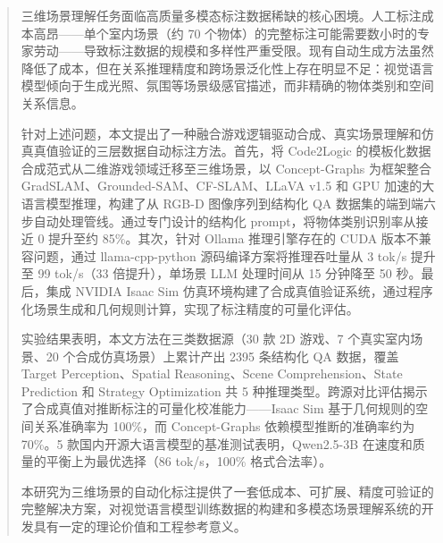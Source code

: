 \documentclass[type=bachelor,oneside]{fduthesis}
\begin{document}
\frontmatter
\tableofcontents

\begin{abstract}
三维场景理解任务面临高质量多模态标注数据稀缺的核心困境。人工标注成本高昂——单个室内场景（约 70 个物体）的完整标注可能需要数小时的专家劳动——导致标注数据的规模和多样性严重受限。现有自动生成方法虽然降低了成本，但在关系推理精度和跨场景泛化性上存在明显不足：视觉语言模型倾向于生成光照、氛围等场景级感官描述，而非精确的物体类别和空间关系信息。

针对上述问题，本文提出了一种融合游戏逻辑驱动合成、真实场景理解和仿真真值验证的三层数据自动标注方法。首先，将 Code2Logic 的模板化数据合成范式从二维游戏领域迁移至三维场景，以 Concept-Graphs 为框架整合 GradSLAM、Grounded-SAM、CF-SLAM、LLaVA v1.5 和 GPU 加速的大语言模型推理，构建了从 RGB-D 图像序列到结构化 QA 数据集的端到端六步自动处理管线。通过专门设计的结构化 prompt，将物体类别识别率从接近 0 提升至约 85\%。其次，针对 Ollama 推理引擎存在的 CUDA 版本不兼容问题，通过 llama-cpp-python 源码编译方案将推理吞吐量从 3 tok/s 提升至 99 tok/s（33 倍提升），单场景 LLM 处理时间从 15 分钟降至 50 秒。最后，集成 NVIDIA Isaac Sim 仿真环境构建了合成真值验证系统，通过程序化场景生成和几何规则计算，实现了标注精度的可量化评估。

实验结果表明，本文方法在三类数据源（30 款 2D 游戏、7 个真实室内场景、20 个合成仿真场景）上累计产出 2395 条结构化 QA 数据，覆盖 Target Perception、Spatial Reasoning、Scene Comprehension、State Prediction 和 Strategy Optimization 共 5 种推理类型。跨源对比评估揭示了合成真值对推断标注的可量化校准能力——Isaac Sim 基于几何规则的空间关系准确率为 100\%，而 Concept-Graphs 依赖模型推断的准确率约为 70\%。5 款国内开源大语言模型的基准测试表明，Qwen2.5-3B 在速度和质量的平衡上为最优选择（86 tok/s，100\% 格式合法率）。

本研究为三维场景的自动化标注提供了一套低成本、可扩展、精度可验证的完整解决方案，对视觉语言模型训练数据的构建和多模态场景理解系统的开发具有一定的理论价值和工程参考意义。
\end{abstract}
\end{document}
